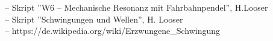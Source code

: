 -- Skript ''W6 -- Mechanische Resonanz mit Fahrbahnpendel'', H.Looser\\
-- Skript ''Schwingungen und Wellen'', H. Looser\\
-- https://de.wikipedia.org/wiki/Erzwungene\_Schwingung\\
